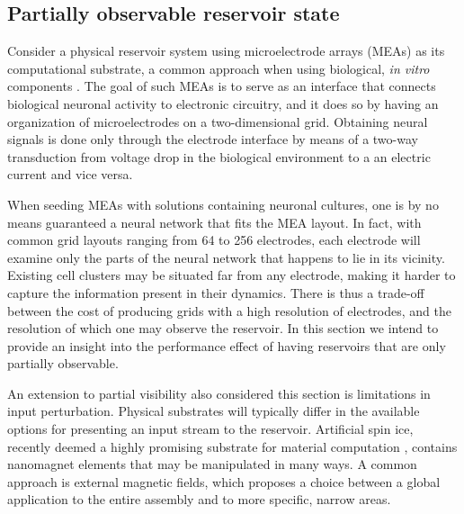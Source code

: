 \subsection{Partially observable reservoir state}

Consider a physical reservoir system using microelectrode arrays (MEAs) as its
computational substrate, a common approach when using biological, \textit{in
vitro} components \cite{aaser_towards_2017}. The goal of such MEAs is to serve
as an interface that connects biological neuronal activity to electronic
circuitry, and it does so by having an organization of microelectrodes on a
two-dimensional grid. Obtaining neural signals is done only through the
electrode interface by means of a two-way transduction from voltage drop in the
biological environment to a an electric current and vice versa.

When seeding MEAs with solutions containing neuronal cultures, one is by no
means guaranteed a neural network that fits the MEA layout. In fact, with common
grid layouts ranging from 64 to 256 electrodes, each electrode will examine only
the parts of the neural network that happens to lie in its vicinity. Existing
cell clusters may be situated far from any electrode, making it harder to
capture the information present in their dynamics. There is thus a trade-off
between the cost of producing grids with a high resolution of electrodes, and
the resolution of which one may observe the reservoir. In this section we intend
to provide an insight into the performance effect of having reservoirs that are
only partially observable.

An extension to partial visibility also considered this section is limitations
in input perturbation. Physical substrates will typically differ in the
available options for presenting an input stream to the reservoir. Artificial
spin ice, recently deemed a highly promising substrate for material computation
\cite{jensen_computation_2018}, contains nanomagnet elements that may be
manipulated in many ways. A common approach is external magnetic fields, which
proposes a choice between a global application to the entire assembly and to
more specific, narrow areas.

